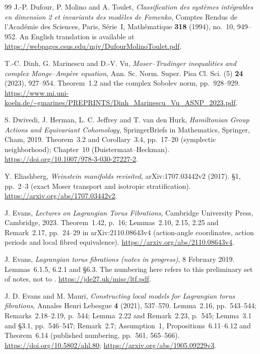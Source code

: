 \begin{thebibliography}{99}
J.-P. Dufour, P. Molino and A. Toulet,
\emph{Classification des systèmes intégrables en dimension 2 et invariants des modèles de Fomenko},
Comptes Rendus de l'Académie des Sciences, Paris, Série~I, Mathématique
\textbf{318} (1994), no.~10, 949--952.
An English translation is available at
\url{https://webpages.csus.edu/mjv/DufourMolinoToulet.pdf}.

T.-C. Dinh, G. Marinescu and D.-V. Vu,
\emph{Moser--Trudinger inequalities and complex Monge--Amp\`ere equation},
Ann. Sc. Norm. Super. Pisa Cl. Sci. (5) \textbf{24} (2023), 927--954.
Theorem~1.2 and the complex Sobolev norm, pp.~928--929.
\url{https://www.mi.uni-koeln.de/~gmarines/PREPRINTS/Dinh_Marinescu_Vu_ASNP_2023.pdf}.

S. Dwivedi, J. Herman, L. C. Jeffrey and T. van den Hurk,
\emph{Hamiltonian Group Actions and Equivariant Cohomology},
SpringerBriefs in Mathematics, Springer, Cham, 2019.
Theorem~3.2 and Corollary~3.4, pp.~17--20 (symplectic neighborhood);
Chapter~10 (Duistermaat--Heckman).
\url{https://doi.org/10.1007/978-3-030-27227-2}.

Y. Eliashberg,
\emph{Weinstein manifolds revisited},
arXiv:1707.03442v2 (2017).
\S1, pp.~2--3 (exact Moser transport and isotropic stratification).
\url{https://arxiv.org/abs/1707.03442v2}.

J. Evans,
\emph{Lectures on Lagrangian Torus Fibrations},
Cambridge University Press, Cambridge, 2023.
Theorem~1.42, p.~16; Lemmas~2.10, 2.15, 2.25 and Remark~2.17,
pp.~24--29 in arXiv:2110.08643v4 (action-angle coordinates, action periods and local fibred equivalence).
\url{https://arxiv.org/abs/2110.08643v4}.

J. Evans,
\emph{Lagrangian torus fibrations (notes in progress)},
8 February 2019.
Lemmas~6.1.5, 6.2.1 and \S6.3.
The numbering here refers to this preliminary set of notes, not to \cite{Evans}.
\url{https://jde27.uk/misc/ltf.pdf}.

J. D. Evans and M. Mauri,
\emph{Constructing local models for Lagrangian torus fibrations},
Annales Henri Lebesgue \textbf{4} (2021), 537--570.
Lemma~2.16, pp.~543--544; Remarks~2.18--2.19, p.~544;
Lemma~2.22 and Remark~2.23, p.~545;
Lemma~3.1 and \S3.1, pp.~546--547; Remark~2.7;
Assumption~1, Propositions~6.11--6.12 and Theorem~6.14
(published numbering, pp.~561, 565--566).
\url{https://doi.org/10.5802/ahl.80};
\url{https://arxiv.org/abs/1905.09229v3}.


\end{thebibliography}
